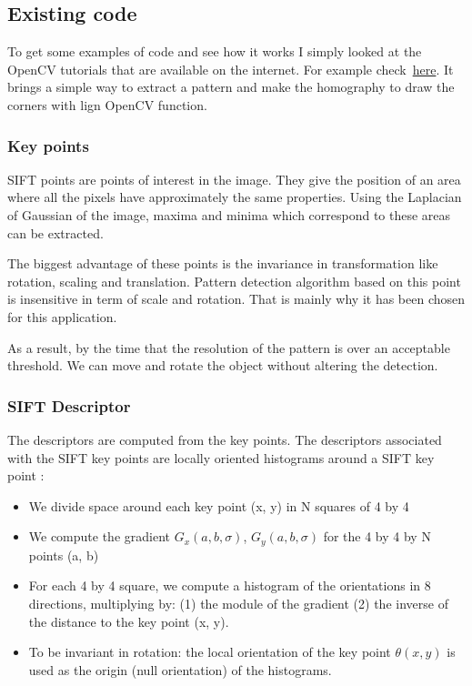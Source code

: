 	\subsection{Existing code}
	
	\par To get some examples of code and see how it works I simply looked at the OpenCV tutorials that are available on the internet. For example check~\hyperlink{opencv}{here}. It brings a simple way to extract a pattern and make the homography to draw the corners with lign OpenCV function.
	
	\subsubsection{Key points}
	\par SIFT points are points of interest in the image. They give the position of an area where all the pixels have approximately the same properties. Using the Laplacian of Gaussian of the image, maxima and minima which correspond to these areas can be extracted.
	\par The biggest advantage of these points is the invariance in transformation like rotation, scaling and translation. Pattern detection algorithm based on this point is insensitive in term of scale and rotation. That is mainly why it has been chosen for this application.
	\par As a result, by the time that the resolution of the pattern is over an acceptable threshold. We can move and rotate the object without altering the detection.
	
	\subsubsection[Descriptor]{SIFT Descriptor}
	\par The descriptors are computed from the key points. The descriptors associated with the SIFT key points are locally oriented histograms around a SIFT key point \cite{AM}:
	
	\begin{itemize}
			\item We divide space around each key point (x, y) in N squares of 4 by 4 \item We compute the gradient \begin{math}G_{x}(a,b,\sigma)\end{math}, \begin{math}G_{y}(a,b,\sigma)\end{math} for the 4 by 4 by N points (a, b)

		\item For each 4 by 4 square, we compute a histogram of the orientations in 8 directions, multiplying by: (1) the module of the gradient (2) the inverse of the distance to the key point (x, y).
 \item To be invariant in rotation: the local orientation of the key point \begin{math} \theta(x,y) \end{math} is used as the origin (null orientation) of the histograms.		
	\end{itemize}
	

